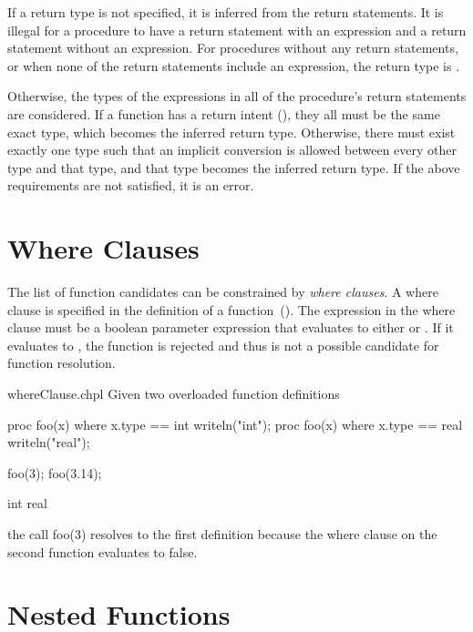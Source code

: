 If a return type is not specified, it is inferred from the return statements.
It is illegal for a procedure to have a return statement with an expression
and a return statement without an expression.
For procedures without any return statements, or when none of the
return statements include an expression, the return type is .

Otherwise, the types of the expressions in all of the procedure's
return statements are considered.
If a function has a  return intent (), they
all must be the same exact type, which becomes the inferred return type.
Otherwise, there must exist exactly one type such that an implicit conversion
is allowed between every other type and that type, and that type becomes the
inferred return type.
If the above requirements are not satisfied, it is an error.

\section{Where Clauses}
\label{Where_Clauses}

The list of function candidates can be constrained by {\em where clauses}.  A
where clause is specified in the definition of a
function~().  The expression in the where clause
must be a boolean parameter expression that evaluates to either  or
. If it evaluates to , the function is rejected and
thus is not a possible candidate for function resolution.

\begin{chapelexample}{whereClause.chpl}
Given two overloaded function definitions
\begin{chapel}
proc foo(x) where x.type == int { writeln("int"); }
proc foo(x) where x.type == real { writeln("real"); }
\end{chapel}
\begin{chapelpost}
foo(3);
foo(3.14);
\end{chapelpost}
\begin{chapeloutput}
int
real
\end{chapeloutput}
the call foo(3) resolves to the first definition because the where clause on
the second function evaluates to false.
\end{chapelexample}

\section{Nested Functions}
\label{Nested_Functions}


